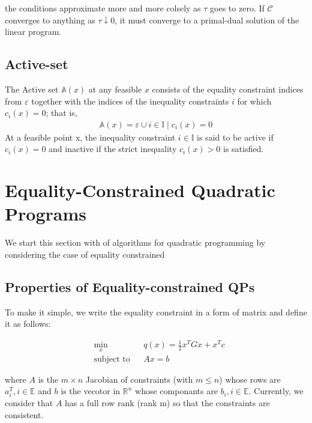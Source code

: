 the conditions approximate more and more colsely as $\tau$ goes to zero. If $\mathcal{C}$ converges to anything as $\tau \downarrow 0$, it must converge to a primal-dual solution of the linear program.


\subsection*{Active-set}
The Active set $\mathbb{A}(x)$ at any feasible $x$ consists of the equality constraint indices from $\varepsilon$ together with the indices of the inequality constraints $i$ for which $c_i(x)=0$; that is,
\begin{equation*}
	\begin{aligned}
		\mathbb{A}(x)=\varepsilon \cup {i\in \mathbb{I}\mid c_i(x)=0}
	\end{aligned}
\end{equation*}
At a feasible point x, the inequality constraint $i\in \mathbb{I}$ is said to be active if $c_i(x)=0$ and inactive if the strict inequality $c_i(x)>0$ is satisfied.

\section{Equality-Constrained Quadratic Programs}

We start this section with of algorithms for quadratic programming by considering the case of equality constrained

\subsection*{Properties of Equality-constrained QPs}
To make it simple, we write the equality constraint in a form of matrix and define it as follows:

\begin{equation}
\begin{aligned}
& \underset{x}{\text{min}}
& & q(x)= \frac{1}{2}x^{T}Gx+x^{T}c \\
& \text{subject to} & &  Ax=b
\end{aligned}
\label{eqn:equality_constrained_QP}
\end{equation}

where $A$ is the $m\times n$ Jacobian of constraints (with $m\leqslant n$) whose rows are $a_i^T,i \in \mathbb{E}$ and $b$ is the vecotor in $\mathbb{R}^n$ whose componants are $b_i, i \in \mathbb{E}$. Currently, we consider that $A$ has a full row rank (rank m) so that the constraints are consistent.

